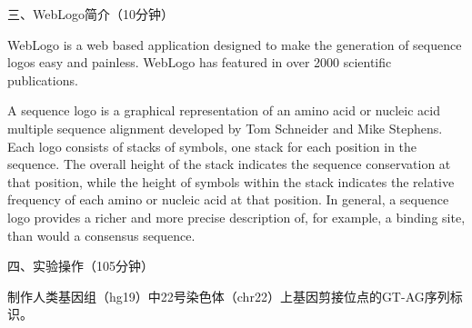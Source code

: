 \documentclass{TIJMUjiaoanSY}
\begin{document}
\vspace*{0.2cm}
\noindent
三、WebLogo简介（10分钟）

WebLogo is a web based application designed to make the generation of sequence logos easy and painless. WebLogo has featured in over 2000 scientific publications.

A sequence logo is a graphical representation of an amino acid or nucleic acid multiple sequence alignment developed by Tom Schneider and Mike Stephens. Each logo consists of stacks of symbols, one stack for each position in the sequence. The overall height of the stack indicates the sequence conservation at that position, while the height of symbols within the stack indicates the relative frequency of each amino or nucleic acid at that position. In general, a sequence logo provides a richer and more precise description of, for example, a binding site, than would a consensus sequence.

\otherTail
\newpage
\otherHeader

\noindent
四、实验操作（105分钟）

制作人类基因组（hg19）中22号染色体（chr22）上基因剪接位点的GT-AG序列标识。
\end{document}
